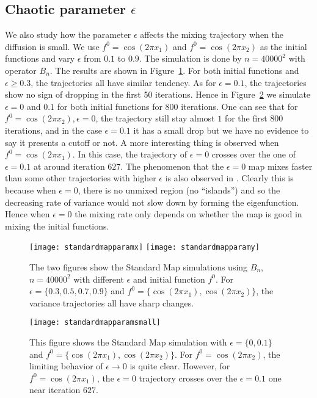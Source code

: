 \subsection{Chaotic parameter $\epsilon$}
We also study how the parameter $\epsilon$ affects the mixing trajectory when the diffusion is small. We use $f^0=\cos(2\pi x_1)$ and $f^0=\cos(2\pi x_2)$ as the initial functions and vary $\epsilon$ from $0.1$ to $0.9$. The simulation is done by $n=40000^2$ with operator $B_n$. The results are shown in Figure~\ref{standardmapparamxy}. For both initial functions and $\epsilon \ge 0.3$, the trajectories all have similar tendency. As for $\epsilon=0.1$, the trajectories show no sign of dropping in the first 50 iterations. Hence in Figure~\ref{standardmapparamsmall} we simulate $\epsilon=0$ and $0.1$ for both initial functions for $800$ iterations. One can see that for $f^0= \cos(2 \pi x_2), \epsilon=0$, the trajectory still stay almost $1$ for the first $800$ iterations, and in the case $\epsilon=0.1$ it has a small drop but we have no evidence to say it presents a cutoff or not. A more interesting thing is observed when $f^0= \cos(2 \pi x_1)$. In this case, the trajectory of $\epsilon=0$ crosses over the one of $\epsilon=0.1$ at around iteration $627$. The phenomenon that the $\epsilon=0$ map mixes faster than some other trajectories with higher $\epsilon$ is also observed in \cite{Mezic2005}. Clearly this is because when $\epsilon=0$, there is no unmixed region (no ``islands'') and so the decreasing rate of variance would not slow down by forming the eigenfunction. Hence when $\epsilon = 0$ the mixing rate only depends on whether the map is good in mixing the initial functions.

\begin{figure}
    \centerline{
      \texttt{[image: standardmapparamx]}
      \texttt{[image: standardmapparamy]}
    }
    \caption{\label{standardmapparamxy} The two figures show the Standard Map simulations using $B_n$, $n=40000^2$ with different $\epsilon$ and initial function $f^0$. For $\epsilon=\{0.3,0.5,0.7,0.9 \}$ and $f^0=\{\cos{(2\pi x_1)},\cos{(2\pi x_2)}\}$, the variance trajectories all have sharp changes.}

\end{figure}


\begin{figure}
    \centerline{
      \texttt{[image: standardmapparamsmall]}
    }
    \caption{\label{standardmapparamsmall} This figure shows the Standard Map simulation with $\epsilon=\{0,0.1\}$ and $f^0=\{\cos{(2\pi x_1)},\cos{(2\pi x_2)}\}$. For $f^0=\cos(2\pi x_2)$, the limiting behavior of $\epsilon \rightarrow 0$ is quite clear. However, for $f^0=\cos(2\pi x_1)$, the $\epsilon=0$ trajectory crosses over the $\epsilon=0.1$ one near iteration $627$.}

\end{figure}

